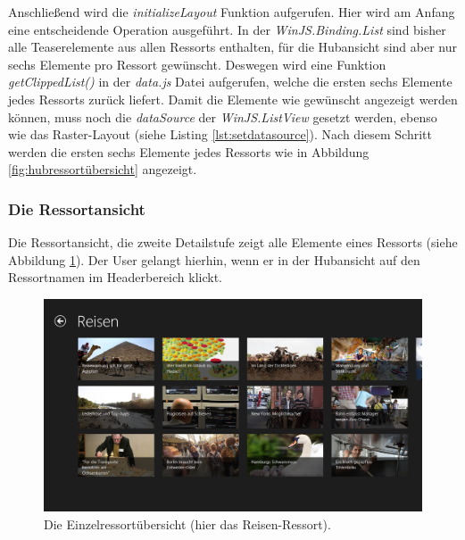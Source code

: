 \documentclass[12pt,a4paper,bibtotoc,abstracton]{scrartcl}
\begin{document}
\begin{minipage}{\linewidth}
  
\end{minipage}

Anschließend wird die \textit{initializeLayout} Funktion aufgerufen. Hier wird am Anfang eine entscheidende Operation ausgeführt. In der \textit{WinJS.Binding.List} sind bisher alle Teaserelemente aus allen Ressorts enthalten, für die Hubansicht sind aber nur sechs Elemente pro Ressort gewünscht. Deswegen wird eine Funktion \textit{getClippedList()} in der \textit{data.js} Datei aufgerufen, welche die ersten sechs Elemente jedes Ressorts zurück liefert. Damit die Elemente wie gewünscht angezeigt werden können, muss noch die \textit{dataSource} der \textit{WinJS.ListView} gesetzt werden, ebenso wie das Raster-Layout (siehe Listing \ref{lst:setdatasource}). Nach diesem Schritt werden die ersten sechs Elemente jedes Ressorts wie in Abbildung \ref{fig:hubressortübersicht} angezeigt.

\begin{minipage}{\linewidth}
  
\end{minipage}

\subsubsection{Die Ressortansicht}
\label{subsubsec:ressortansicht}
Die Ressortansicht, die zweite Detailstufe zeigt alle Elemente eines Ressorts (siehe Abbildung \ref{fig:einzelressortübersicht}). Der User gelangt hierhin, wenn er in der Hubansicht auf den Ressortnamen im Headerbereich klickt. 

\begin{figure}[h]
	\centering
	\includegraphics[width=\textwidth]{Bilder/Screenshots/app/reise_aegypten_3gdmit.png} 
	\caption[Die Einzelressortübersicht]{Die Einzelressortübersicht (hier das Reisen-Ressort).}
	\label{fig:einzelressortübersicht}
\end{figure}
\end{document}
